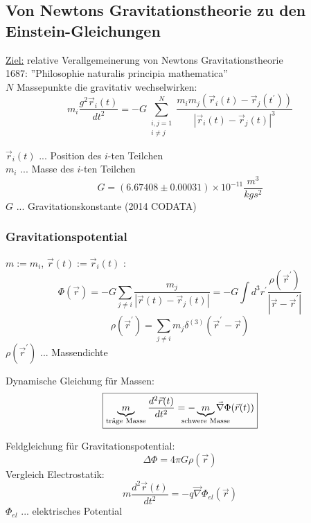 \documentclass[a4paper, 11pt]{article}
\numberwithin{equation}{section}
\begin{document}
\subsection{Von Newtons Gravitationstheorie zu den \\Einstein-Gleichungen}
\underline{Ziel:} relative Verallgemeinerung von Newtons Gravitationstheorie\\
1687: ''Philosophie naturalis principia mathematica''\\
$N$ Massepunkte die gravitativ wechselwirken: 
\begin{equation}
\label{glg:0_Newton}
m_i \dfrac{g^2\vec{r}_i(t)}{dt^2} = - G \sum^N_{\substack{i,j = 1\\ i \neq j}} \dfrac{m_i m_j (\vec{r} _i(t)-\vec{r}_j(t^\prime))}{|\vec{r}_i(t) - \vec{r}_j(t)|^3}
\end{equation}

$\vec{r}_i(t)$ ... Position des $i$-ten Teilchen\\
$m_i$ ... Masse des $i$-ten Teilchen 
\begin{equation}\label{glg:0_Gravitationskonstante}
G = (6.67408 \pm 0.00031)\times 10^{-11} \dfrac{m^3}{kg s^2}
\end{equation}
$G$ ... Gravitationskonstante (2014 CODATA)

\subsubsection*{Gravitationspotential}
$m:= m_i$, $\vec{r}(t):= \vec{r}_i(t)$ :
\begin{equation}
\label{glg:0_Gravitationspotential}
\Phi(\vec{r}) = - G \sum_{j \neq i} \dfrac{m_j}{|\vec{r}(t)-\vec{r}_j(t)|} = -G \int d^3r^\prime \dfrac{\rho(\vec{r}^\prime)}{|\vec{r}-\vec{r}^\prime|}
\end{equation}
\begin{equation}
\label{glg:0_Massendichte}
\rho(\vec{r}^\prime)=\sum\limits_{j\neq i} m_j \delta^{(3)}(\vec{r}^\prime-\vec{r})
\end{equation}
$\rho(\vec{r}^\prime)$ ... Massendichte


Dynamische Gleichung für Massen:
\begin{equation}
\label{glg:0_dynamischeGleichungFuerMassen}
\boxed{
\underbrace{m}_{\text{träge Masse}} \dfrac{d^2\vec{r}(t)}{dt^2} = -\underbrace{m}_{\mathclap{\text{schwere Masse}}} \vec{\nabla} \Phi(\vec{r}(t))
}
\end{equation}

Feldgleichung für Gravitationspotential:
\begin{equation}
\label{glg:0_FeldgleichungGravitationspotential}
\boxed{
\Delta \Phi = 4 \pi G \rho(\vec{r})
}
\end{equation}
Vergleich Electrostatik:
\begin{equation}
\label{glg:0_LadungImStatischenElektrischenFeld}
m \dfrac{d^2 \vec{r}(t)}{dt^2} = - q \vec{\nabla} \Phi_{el}(\vec{r})
\end{equation}
$\Phi_{el}$ ... elektrisches Potential
\end{document}
